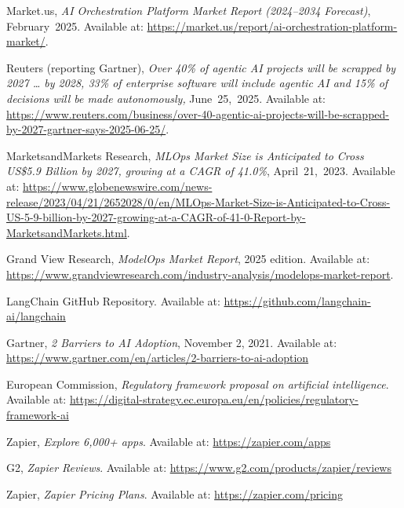 \documentclass[11pt, a4paper, oneside]{article}
\begin{document}
\begin{thebibliography}{99}

    Market.us, \textit{AI Orchestration Platform Market Report (2024--2034 Forecast)}, February~2025.  
    Available at: \url{https://market.us/report/ai-orchestration-platform-market/}.
    
    Reuters (reporting Gartner), \textit{Over 40\% of agentic AI projects will be scrapped by 2027 … by 2028, 33\% of enterprise software will include agentic AI and 15\% of decisions will be made autonomously,} June~25,~2025.
    Available at: \url{https://www.reuters.com/business/over-40-agentic-ai-projects-will-be-scrapped-by-2027-gartner-says-2025-06-25/}.

    MarketsandMarkets Research, \textit{MLOps Market Size is Anticipated to Cross US\$5.9 Billion by 2027, growing at a CAGR of 41.0\%}, April~21,~2023.
    Available at: \url{https://www.globenewswire.com/news-release/2023/04/21/2652028/0/en/MLOps-Market-Size-is-Anticipated-to-Cross-US-5-9-billion-by-2027-growing-at-a-CAGR-of-41-0-Report-by-MarketsandMarkets.html}.

    Grand View Research, \textit{ModelOps Market Report}, 2025 edition.  
    Available at: \url{https://www.grandviewresearch.com/industry-analysis/modelops-market-report}.
    
    LangChain GitHub Repository.
    Available at: \url{https://github.com/langchain-ai/langchain}

    Gartner, \textit{2 Barriers to AI Adoption}, November 2, 2021. Available at: \url{https://www.gartner.com/en/articles/2-barriers-to-ai-adoption}

    European Commission, \textit{Regulatory framework proposal on artificial intelligence}.
    Available at: \url{https://digital-strategy.ec.europa.eu/en/policies/regulatory-framework-ai}
    
    Zapier, \textit{Explore 6,000+ apps}.
    Available at: \url{https://zapier.com/apps}

    G2, \textit{Zapier Reviews}.
    Available at: \url{https://www.g2.com/products/zapier/reviews}

    Zapier, \textit{Zapier Pricing Plans}.
    Available at: \url{https://zapier.com/pricing}


\end{thebibliography}
\end{document}

